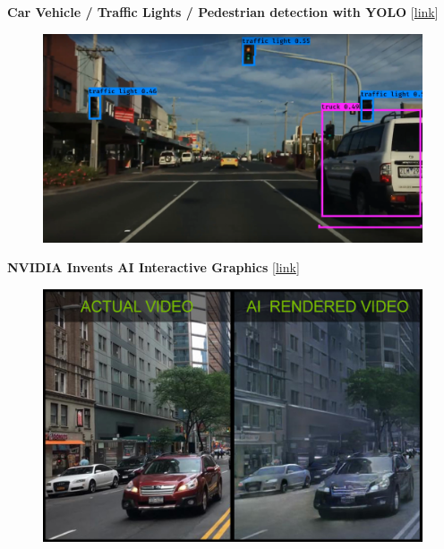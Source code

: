 \documentclass[10pt, compress]{beamer}
\begin{document}
\begin{frame}
  \vspace{.6cm}
  \textbf{Car Vehicle / Traffic Lights / Pedestrian detection with YOLO} [\href{https://www.youtube.com/watch?v=OksuVuNY5o0}{link}] \\

  \vspace{.6cm}
  \begin{figure}
    \includegraphics[width=.85\linewidth]{imgs/edx_dl_keras/8}
  \end{figure}
\end{frame}

\begin{frame}
  \vspace{.6cm}
  \textbf{NVIDIA Invents AI Interactive Graphics} [\href{https://news.developer.nvidia.com/nvidia-invents-ai-interactive-graphics/}{link}] \\

  \vspace{.6cm}
  \begin{figure}
    \includegraphics[width=.9\linewidth]{imgs/news/nvidia_1}
  \end{figure}
\end{frame}
\end{document}
